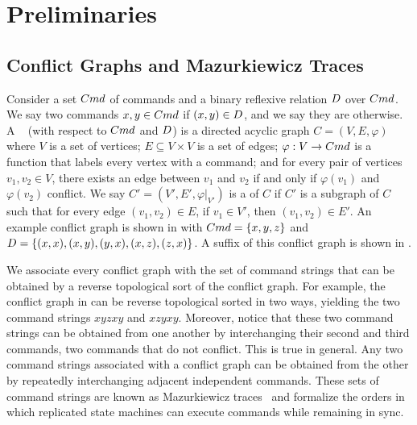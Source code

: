 \section{Preliminaries}

\subsection{Conflict Graphs and Mazurkiewicz Traces}


Consider a set $Cmd$ of commands and a binary reflexive relation $D$
over $Cmd$. We say two commands $x, y \in Cmd$  if $(x, y)
\in D$, and we say they are  otherwise. A
~\cite{mazurkiewicz1995introduction} (with respect to
$Cmd$ and $D$) is a directed acyclic graph $C = (V, E, \varphi)$ where
%
  $V$ is a set of vertices;
%
  $E \subseteq V \times V$ is a set of edges;
%
  $\varphi: V \to Cmd$ is a function that labels every vertex with a command;
  and
%
  for every pair of vertices $v_1, v_2 \in V$, there exists an edge between
  $v_1$ and $v_2$ if and only if $\varphi(v_1)$ and $\varphi(v_2)$ conflict.
%
We say $C' = (V', E', \varphi|_{V'})$ is a  of $C$ if $C'$ is a
subgraph of $C$ such that for every edge $(v_1, v_2) \in E$, if $v_1 \in V'$,
then $(v_1, v_2) \in E'$.
%
An example conflict graph is shown in  with $Cmd
= \{x, y, z\}$ and $D = \{(x, x), (x, y), (y, x), (x, z), (z,
x)\}$. A suffix of this conflict graph is shown in .

We associate every conflict graph with the set of command strings that can be
obtained by a reverse topological sort of the conflict graph. For example, the
conflict graph in  can be reverse topological
sorted in two ways, yielding the two command strings $xyzxy$ and $xzyxy$.
Moreover, notice that these two command strings can be obtained from one
another by interchanging their second and third commands, two commands that do
not conflict. This is true in general. Any two command strings associated with
a conflict graph can be obtained from the other by repeatedly interchanging
adjacent independent commands. These sets of command strings are known as
Mazurkiewicz traces~\cite{mazurkiewicz1985semantics,
mazurkiewicz1995introduction} and formalize the orders in which replicated
state machines can execute commands while remaining in sync.

